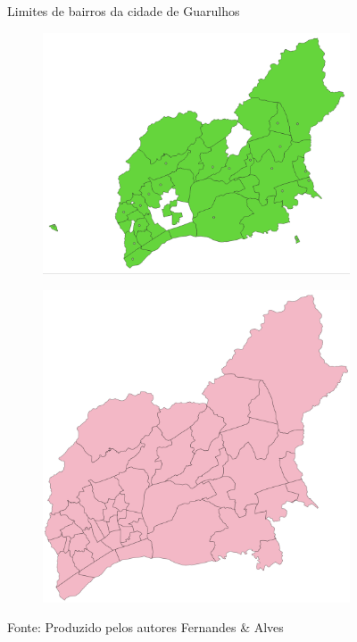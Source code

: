 \begin{figure}[htbp]
    \caption{Limites de bairros da cidade de Guarulhos}
    \begin{subfigure}{0.49\textwidth}
        \includegraphics[height=0.75\textwidth]{images/4_materiais/gis/Guarulhos_SHAPE_QGIS.png}
        \label{fig:GRU_shapefile}
    \end{subfigure}
    \begin{subfigure}{0.49\textwidth}
        \includegraphics[height=0.75\textwidth]{images/4_materiais/gis/BairrosGuarulhosNovo.png}
        \label{fig:GRU_shapefile_QGIS}
    \end{subfigure}
    \centering
    \caption*{Fonte: Produzido pelos autores Fernandes \& Alves}
\end{figure}

